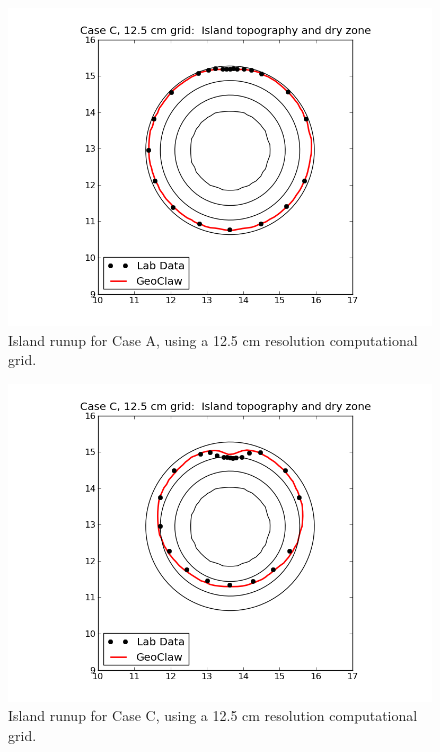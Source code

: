 \begin{figure}[ht]
\hfil\includegraphics[width=5in]{bp6/A12-5Runup.png}\hfil
\caption{\label{A12-5Runup}
Island runup for Case A, using a 12.5 cm resolution computational grid.
  }
\end{figure}

\begin{figure}[ht]
\hfil\includegraphics[width=5in]{bp6/C12-5Runup.png}\hfil
\caption{\label{C12-5Runup}
Island runup for Case C, using a 12.5 cm resolution computational grid.
  }
\end{figure}
